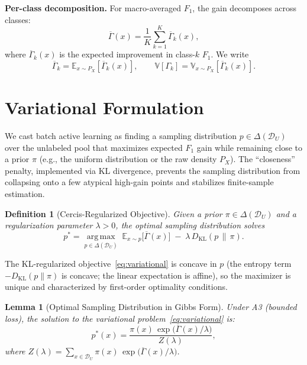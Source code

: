 \documentclass[12pt,a4paper]{article}
\newtheorem{lemma}[theorem]{Lemma}
\newtheorem{definition}[theorem]{Definition}
\newcommand{\E}{\mathbb{E}}
\newcommand{\V}{\mathbb{V}}
\newcommand{\cD}{\mathcal{D}}
\newcommand{\argmax}{\operatorname*{arg\,max}}
\newcommand{\KL}{D_{\mathrm{KL}}}
\begin{document}
\medskip\noindent
\textbf{Per-class decomposition.}
For macro-averaged $F_1$, the gain decomposes across classes:
\begin{equation}\label{eq:decomp}
    \overline{\Gamma}(x) =
    \frac{1}{K}\sum_{k=1}^{K} \overline{\Gamma}_k(x),
\end{equation}
where $\overline{\Gamma}_k(x)$ is the expected improvement in class-$k$
$F_1$.  We write
\begin{equation}\label{eq:class-gain-moments}
    \overline{\Gamma}_k = \E_{x\sim P_X}[\overline{\Gamma}_k(x)],\qquad
    \V[\Gamma_k] = \V_{x\sim P_X}[\overline{\Gamma}_k(x)].
\end{equation}

\section{Variational Formulation}

We cast batch active learning as finding a sampling distribution
$p\in\Delta(\cD_U)$ over the unlabeled pool that maximizes expected $F_1$
gain while remaining close to a prior $\pi$ (e.g., the uniform distribution
or the raw density $P_X$).  The ``closeness'' penalty, implemented via KL
divergence, prevents the sampling distribution from collapsing onto a few
atypical high-gain points and stabilizes finite-sample estimation.

\begin{definition}[Cercis-Regularized Objective]
\label{def:objective}
Given a prior $\pi\in\Delta(\cD_U)$ and a regularization parameter
$\lambda>0$, the optimal sampling distribution solves
\begin{equation}\label{eq:variational}
    p^* = \argmax_{p\in\Delta(\cD_U)}\;
    \E_{x\sim p}\big[\overline{\Gamma}(x)\big]
    \;- \; \lambda\,\KL(p\,\|\,\pi).
\end{equation}
\end{definition}

The KL-regularized objective~\eqref{eq:variational} is concave in $p$ (the
entropy term $-\KL(p\|\pi)$ is concave; the linear expectation is
affine), so the maximizer is unique and characterized by first-order
optimality conditions.

\begin{lemma}[Optimal Sampling Distribution in Gibbs Form]
\label{lem:gibbs}
Under A3 (bounded loss), the solution to the variational problem~\eqref{eq:variational} is:
\begin{equation}\label{eq:gibbs-sol}
    p^*(x) = \frac{\pi(x)\,\exp\!\big(\overline{\Gamma}(x)/\lambda\big)}
                  {Z(\lambda)},
\end{equation}
where $Z(\lambda)=\sum_{x\in\cD_U}\pi(x)\,
\exp\big(\overline{\Gamma}(x)/\lambda\big)$.
\end{lemma}
\end{document}
